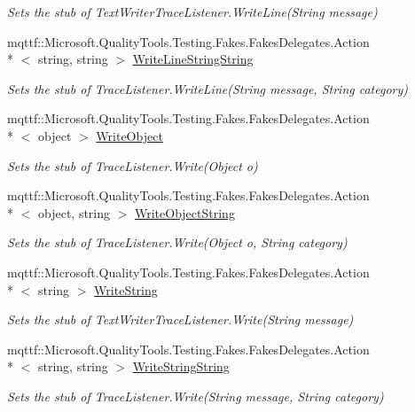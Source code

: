 \begin{DoxyCompactItemize}
\begin{DoxyCompactList}\small\item\em Sets the stub of Text\-Writer\-Trace\-Listener.\-Write\-Line(\-String message)\end{DoxyCompactList}\item 
mqttf\-::\-Microsoft.\-Quality\-Tools.\-Testing.\-Fakes.\-Fakes\-Delegates.\-Action\\*
$<$ string, string $>$ \hyperlink{class_system_1_1_diagnostics_1_1_fakes_1_1_stub_delimited_list_trace_listener_ab21c474b1bc8643e6ad57c124a6e8420}{Write\-Line\-String\-String}
\begin{DoxyCompactList}\small\item\em Sets the stub of Trace\-Listener.\-Write\-Line(\-String message, String category)\end{DoxyCompactList}\item 
mqttf\-::\-Microsoft.\-Quality\-Tools.\-Testing.\-Fakes.\-Fakes\-Delegates.\-Action\\*
$<$ object $>$ \hyperlink{class_system_1_1_diagnostics_1_1_fakes_1_1_stub_delimited_list_trace_listener_aa916f8809fef7ada180588c69e5d0b09}{Write\-Object}
\begin{DoxyCompactList}\small\item\em Sets the stub of Trace\-Listener.\-Write(\-Object o)\end{DoxyCompactList}\item 
mqttf\-::\-Microsoft.\-Quality\-Tools.\-Testing.\-Fakes.\-Fakes\-Delegates.\-Action\\*
$<$ object, string $>$ \hyperlink{class_system_1_1_diagnostics_1_1_fakes_1_1_stub_delimited_list_trace_listener_abea6595775ebd794527b64e0f212a1dc}{Write\-Object\-String}
\begin{DoxyCompactList}\small\item\em Sets the stub of Trace\-Listener.\-Write(\-Object o, String category)\end{DoxyCompactList}\item 
mqttf\-::\-Microsoft.\-Quality\-Tools.\-Testing.\-Fakes.\-Fakes\-Delegates.\-Action\\*
$<$ string $>$ \hyperlink{class_system_1_1_diagnostics_1_1_fakes_1_1_stub_delimited_list_trace_listener_a630af1bfca293210d442b8ff70637e09}{Write\-String}
\begin{DoxyCompactList}\small\item\em Sets the stub of Text\-Writer\-Trace\-Listener.\-Write(\-String message)\end{DoxyCompactList}\item 
mqttf\-::\-Microsoft.\-Quality\-Tools.\-Testing.\-Fakes.\-Fakes\-Delegates.\-Action\\*
$<$ string, string $>$ \hyperlink{class_system_1_1_diagnostics_1_1_fakes_1_1_stub_delimited_list_trace_listener_a7398166a90fcf6c8972658eef4ff8c5c}{Write\-String\-String}
\begin{DoxyCompactList}\small\item\em Sets the stub of Trace\-Listener.\-Write(\-String message, String category)\end{DoxyCompactList}\end{DoxyCompactItemize}
